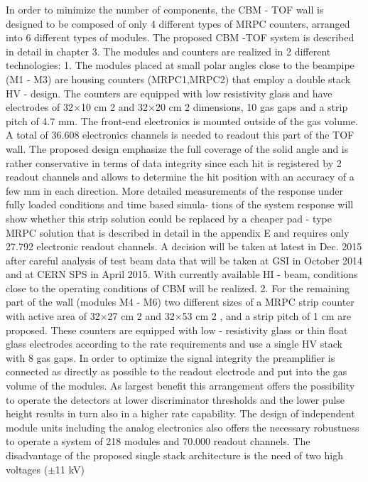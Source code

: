 In order to minimize the number of components, the CBM - TOF wall is designed to be composed of
only 4 different types of MRPC counters, arranged into 6 different types of modules. The proposed CBM
-TOF system is described in detail in chapter 3.
The modules and counters are realized in 2 different technologies:
1. The modules placed at small polar angles close to the beampipe (M1 - M3) are housing counters
(MRPC1,MRPC2) that employ a double stack HV - design. The counters are equipped with low
resistivity glass and have electrodes of 32$\times$10 cm 2 and 32$\times$20 cm 2 dimensions, 10 gas gaps and a
strip pitch of 4.7 mm. The front-end electronics is mounted outside of the gas volume. A total of
36.608 electronics channels is needed to readout this part of the TOF wall.
The proposed design emphasize the full coverage of the solid angle and is rather conservative in
terms of data integrity since each hit is registered by 2 readout channels and allows to determine
the hit position with an accuracy of a few mm in each direction.
More detailed measurements of the response under fully loaded conditions and time based simula-
tions of the system response will show whether this strip solution could be replaced by a cheaper
pad - type MRPC solution that is described in detail in the appendix E and requires only 27.792
electronic readout channels.
A decision will be taken at latest in Dec. 2015 after careful analysis of test beam data that will
be taken at GSI in October 2014 and at CERN SPS in April 2015. With currently available HI -
beam, conditions close to the operating conditions of CBM will be realized.
2. For the remaining part of the wall (modules M4 - M6) two different sizes of a MRPC strip counter
with active area of 32$\times$27 cm 2 and 32$\times$53 cm 2 , and a strip pitch of 1 cm are proposed. These
counters are equipped with low - resistivity glass or thin float glass electrodes according to the rate
requirements and use a single HV stack with 8 gas gaps. In order to optimize the signal integrity
the preamplifier is connected as directly as possible to the readout electrode and put into the gas
volume of the modules. As largest benefit this arrangement offers the possibility to operate the
detectors at lower discriminator thresholds and the lower pulse height results in turn also in a higher
rate capability. The design of independent module units including the analog electronics also offers
the necessary robustness to operate a system of 218 modules and 70.000 readout channels.
The disadvantage of the proposed single stack architecture is the need of two high voltages ($\pm$11 kV)
